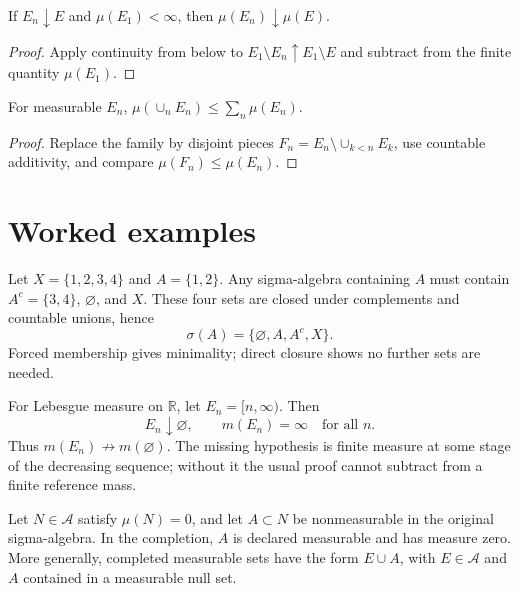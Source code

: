 \begin{theorem}\label{thm:iii01-02}
If $E_n\downarrow E$ and $\mu(E_1)<\infty$, then $\mu(E_n)\downarrow\mu(E)$.
\begin{proof}
Apply continuity from below to $E_1\setminus E_n\uparrow E_1\setminus E$ and subtract from the finite quantity $\mu(E_1)$.
\end{proof}
\end{theorem}

\begin{theorem}\label{thm:iii01-03}
For measurable $E_n$, $\mu(\cup_nE_n)\le\sum_n\mu(E_n)$.
\begin{proof}
Replace the family by disjoint pieces $F_n=E_n\setminus\cup_{k<n}E_k$, use countable additivity, and compare $\mu(F_n)\le\mu(E_n)$.
\end{proof}
\end{theorem}

\section{Worked examples}

\begin{example}\label{ex:iii01-worked-01}
Let \(X=\{1,2,3,4\}\) and \(A=\{1,2\}\). Any sigma-algebra containing \(A\)
must contain \(A^c=\{3,4\}\), \(\varnothing\), and \(X\). These four sets are
closed under complements and countable unions, hence
\[
\sigma(A)=\{\varnothing,A,A^c,X\}.
\]
Forced membership gives minimality; direct closure shows no further sets are needed.
\end{example}

\begin{example}\label{ex:iii01-worked-02}
For Lebesgue measure on \(\mathbb R\), let \(E_n=[n,\infty)\). Then
\[
E_n\downarrow\varnothing,\qquad m(E_n)=\infty\quad\text{for all }n.
\]
Thus \(m(E_n)\not\to m(\varnothing)\). The missing hypothesis is finite measure
at some stage of the decreasing sequence; without it the usual proof cannot
subtract from a finite reference mass.
\end{example}

\begin{example}\label{ex:iii01-worked-03}
Let \(N\in\mathcal A\) satisfy \(\mu(N)=0\), and let \(A\subset N\) be
nonmeasurable in the original sigma-algebra. In the completion, \(A\) is
declared measurable and has measure zero. More generally, completed measurable
sets have the form \(E\cup A\), with \(E\in\mathcal A\) and \(A\) contained in a
measurable null set.
\end{example}

